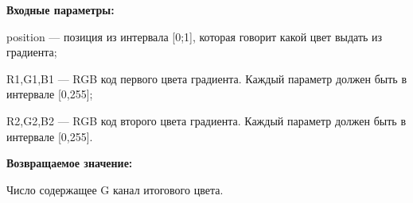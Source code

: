 \textbf{Входные параметры:}  

position --- позиция из интервала [0;1], которая говорит какой цвет выдать из градиента;
 
    R1,G1,B1 --- RGB код первого цвета градиента. Каждый параметр должен быть в интервале [0,255];
 
    R2,G2,B2 --- RGB код второго цвета градиента. Каждый параметр должен быть в интервале [0,255].

\textbf{Возвращаемое значение:}

Число содержащее G канал итогового цвета.